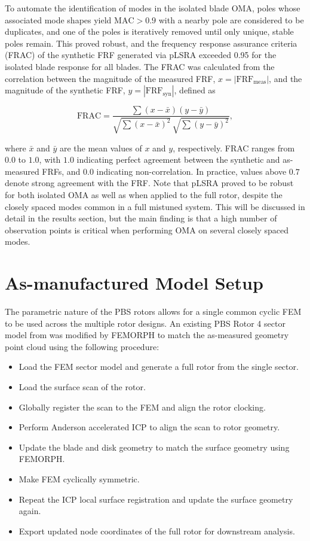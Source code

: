 \documentclass[colorlinks,upint,subscriptcorrection,varvw,hyphenate,balance,govt]{asmeconf}
\begin{document}
To automate the identification of modes in the isolated blade OMA, poles whose associated mode shapes yield $\text{MAC} > 0.9$ with a nearby pole are considered to be duplicates, and one of the poles is iteratively removed until only unique, stable poles remain. This proved robust, and the frequency response assurance criteria (FRAC) of the synthetic FRF generated via pLSRA exceeded 0.95 for the isolated blade response for all blades. The FRAC was calculated from the correlation between the magnitude of the measured FRF, $x = |\text{FRF}_\text{meas}|$, and the magnitude of the synthetic FRF, $y = |\text{FRF}_\text{syn}|$, defined as

\begin{equation}\label{eq:rac_pyfbs}
    \text{FRAC} = \frac{\sum (x - \bar{x})(y - \bar{y})}{\sqrt{\sum (x - \bar{x})^2} \, \sqrt{\sum (y - \bar{y})^2}},
\end{equation}

\noindent
where $\bar{x}$ and $\bar{y}$ are the mean values of $x$ and $y$, respectively. FRAC ranges from $0.0$ to $1.0$, with $1.0$ indicating perfect agreement between the synthetic and as-measured FRFs, and 0.0 indicating non-correlation. In practice, values above $0.7$ denote strong agreement with the FRF. Note that pLSRA proved to be robust for both isolated OMA as well as when applied to the full rotor, despite the closely spaced modes common in a full mistuned system. This will be discussed in detail in the results section, but the main finding is that a high number of observation points is critical when performing OMA on several closely spaced modes.

\section{As-manufactured Model Setup}

The parametric nature of the PBS rotors allows for a single common cyclic FEM to be used across the multiple rotor designs. An existing PBS Rotor 4 sector model from \cite{Gillaugh2018, Gillaugh2019} was modified by FEMORPH to match the as-measured geometry point cloud using the following procedure:

\begin{itemize}
    \item Load the FEM sector model and generate a full rotor from the single sector.
    \item Load the surface scan of the rotor.
    \item Globally register the scan to the FEM and align the rotor clocking.
    \item Perform Anderson accelerated ICP to align the scan to rotor geometry.
    \item Update the blade and disk geometry to match the surface geometry using FEMORPH.
    \item Make FEM cyclically symmetric.
    \item Repeat the ICP local surface registration and update the surface geometry again.
    \item Export updated node coordinates of the full rotor for downstream analysis.
\end{itemize}
\end{document}
